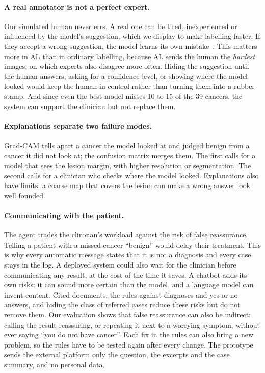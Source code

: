 \documentclass{article}
\begin{document}
\paragraph{A real annotator is not a perfect expert.}
Our simulated human never errs. A real one can be tired, inexperienced or influenced by the
model's suggestion, which we display to make labelling faster. If they accept a wrong
suggestion, the model learns its own mistake~\cite{goddard2012automation}. This matters more
in AL than in ordinary labelling, because AL sends the human the \emph{hardest} images, on
which experts also disagree more often. Hiding the suggestion until the human answers,
asking for a confidence level, or showing where the model looked would keep the human in
control rather than turning them into a rubber stamp. And since even the best model misses 10 to 15 of the
39 cancers, the system can support the clinician but not replace them.

\paragraph{Explanations separate two failure modes.}
Grad-CAM tells apart a cancer the model looked at and judged benign from a cancer it did
not look at; the confusion matrix merges them. The first calls for a model that sees the
lesion margin, with higher resolution or segmentation. The second calls for a clinician who
checks where the model looked. Explanations also have limits: a coarse map that covers the
lesion can make a wrong answer look well founded.

\paragraph{Communicating with the patient.}
The agent trades the clinician's workload against the risk of false reassurance. Telling a
patient with a missed cancer ``benign'' would delay their treatment. This is why every
automatic message states that it is not a diagnosis and every case stays in the log. A
deployed system could also wait for the clinician before communicating any result, at the
cost of the time it saves. A chatbot adds its own risks: it can sound more certain than the
model, and a language model can invent content. Cited documents, the rules against
diagnoses and yes-or-no answers, and hiding the class of referred cases reduce these risks
but do not remove them. Our evaluation shows that false reassurance can also be indirect:
calling the result reassuring, or repeating it next to a worrying symptom, without ever
saying ``you do not have cancer''. Each fix in the rules can also bring a new problem, so the
rules have to be tested again after every change. The prototype sends the external platform only the question, the
excerpts and the case summary, and no personal data.
\end{document}

